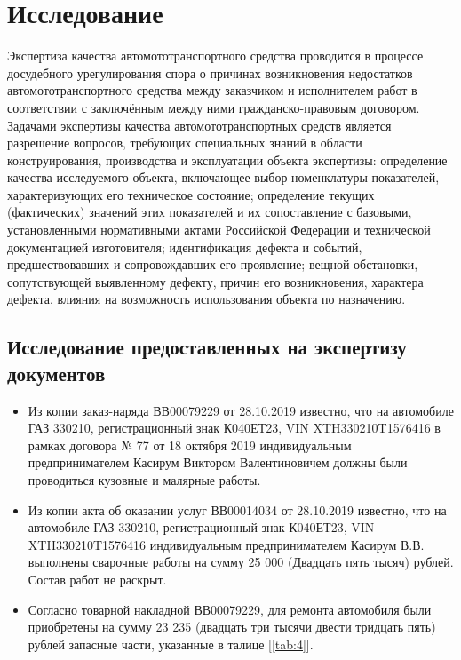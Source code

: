 


\section{Исследование}
%
Экспертиза качества автомототранспортного средства проводится в процессе досудебного урегулирования спора о причинах возникновения недостатков автомототранспортного средства между заказчиком и  исполнителем работ в соответствии  с заключённым между ними гражданско-правовым договором.
Задачами экспертизы качества автомототранспортных средств является разрешение вопросов, требующих специальных знаний в области конструирования, производства и эксплуатации объекта экспертизы: определение качества исследуемого объекта, включающее выбор номенклатуры показателей, характеризующих его техническое состояние; определение текущих (фактических) значений этих показателей и их сопоставление с базовыми, установленными нормативными актами Российской Федерации и технической документацией изготовителя; идентификация дефекта и событий, предшествовавших и сопровождавших его проявление; вещной обстановки, сопутствующей выявленному дефекту, причин его возникновения, характера дефекта, влияния на возможность использования объекта по назначению.

\subsection{Исследование предоставленных на экспертизу документов}

\begin{itemize}
	\item Из копии заказ-наряда  ВВ00079229 от 28.10.2019 известно, что на автомобиле ГАЗ 330210, регистрационный знак К040ЕТ23, VIN XTH330210T1576416 в рамках договора № 77 от 18 октября 2019 индивидуальным предпринимателем Касирум Виктором Валентиновичем должны были  проводиться кузовные и малярные работы.
	\item Из копии акта об оказании услуг ВВ00014034 от 28.10.2019 известно, что на автомобиле ГАЗ 330210, регистрационный знак К040ЕТ23, VIN XTH330210T1576416 индивидуальным предпринимателем Касирум В.В. выполнены сварочные работы на сумму 25 000 (Двадцать пять тысяч) рублей. Состав работ не раскрыт. 
	\item Согласно товарной накладной ВВ00079229, для ремонта автомобиля были приобретены на сумму 23 235 (двадцать три тысячи двести тридцать пять) рублей	запасные части, указанные в талице [\ref{tab:4}].
\end{itemize}


